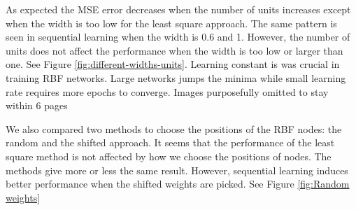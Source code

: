 \documentclass[a4paper]{article}
\begin{document}
As expected the MSE error decreases when the number of units increases except when the width is too low for the least square approach. The same pattern is seen in sequential learning when the width is 0.6 and 1. However, the number of units does not affect the performance when the width is too low or larger than one. See Figure \ref{fig:different-widths-units}. Learning constant is was crucial in training RBF networks. Large networks jumps the minima while small learning rate requires more epochs to converge. Images purposefully omitted to stay within 6 pages

We also compared two methods to choose the positions of the RBF nodes: the random and the shifted approach. It seems that the performance of the least square method is not affected by how we choose the positions of nodes. The methods give more or less the same result. However, sequential learning induces better performance when the shifted weights are picked. See Figure \ref{fig:Random weights}
\end{document}
